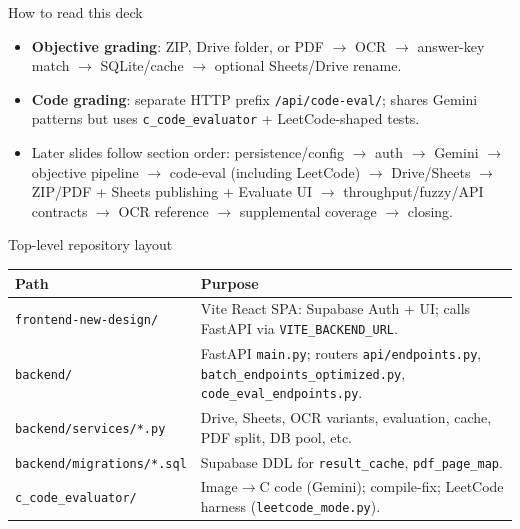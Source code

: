 \documentclass[aspectratio=169]{beamer}
\begin{document}
\begin{frame}[t]{How to read this deck}
  \small
  \begin{itemize}
    \item \textbf{Objective grading}: ZIP, Drive folder, or PDF $\rightarrow$ OCR $\rightarrow$ answer-key match $\rightarrow$ SQLite/cache $\rightarrow$ optional Sheets/Drive rename.
    \item \textbf{Code grading}: separate HTTP prefix \texttt{/api/code-eval/}; shares Gemini patterns but uses \texttt{c\_code\_evaluator} + LeetCode-shaped tests.
    \item Later slides follow section order: persistence/config $\rightarrow$ auth $\rightarrow$ Gemini $\rightarrow$ objective pipeline $\rightarrow$ code-eval (including LeetCode) $\rightarrow$ Drive/Sheets $\rightarrow$ ZIP/PDF + Sheets publishing + Evaluate UI $\rightarrow$ throughput/fuzzy/API contracts $\rightarrow$ OCR reference $\rightarrow$ supplemental coverage $\rightarrow$ closing.
  \end{itemize}
\end{frame}

\begin{frame}{Top-level repository layout}
  \footnotesize
  \begin{tabular}{@{}p{4.2cm}p{9.4cm}@{}}
    \toprule
    Path & Purpose \\
    \midrule
    \texttt{frontend-new-design/} & Vite React SPA: Supabase Auth + UI; calls FastAPI via \texttt{VITE\_BACKEND\_URL}. \\
    \texttt{backend/} & FastAPI \texttt{main.py}; routers \texttt{api/endpoints.py}, \texttt{batch\_endpoints\_optimized.py}, \texttt{code\_eval\_endpoints.py}. \\
    \texttt{backend/services/*.py} & Drive, Sheets, OCR variants, evaluation, cache, PDF split, DB pool, etc. \\
    \texttt{backend/migrations/*.sql} & Supabase DDL for \texttt{result\_cache}, \texttt{pdf\_page\_map}. \\
    \texttt{c\_code\_evaluator/} & Image$\rightarrow$C code (Gemini); compile-fix; LeetCode harness (\texttt{leetcode\_mode.py}). \\
    \bottomrule
  \end{tabular}
\end{frame}
\end{document}
